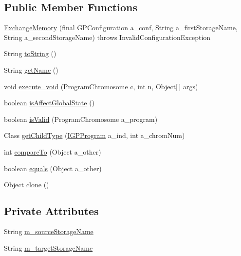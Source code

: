 \subsection*{Public Member Functions}
\begin{DoxyCompactItemize}
\item 
\hyperlink{classorg_1_1jgap_1_1gp_1_1function_1_1_exchange_memory_a19922874a417c3e1754dbcac64d1d609}{Exchange\-Memory} (final G\-P\-Configuration a\-\_\-conf, String a\-\_\-first\-Storage\-Name, String a\-\_\-second\-Storage\-Name)  throws Invalid\-Configuration\-Exception 
\item 
String \hyperlink{classorg_1_1jgap_1_1gp_1_1function_1_1_exchange_memory_abecb2cbef10e036fe2602ef2e7ebe6d9}{to\-String} ()
\item 
String \hyperlink{classorg_1_1jgap_1_1gp_1_1function_1_1_exchange_memory_a1888688c7830172d9efc8d5976a18182}{get\-Name} ()
\item 
void \hyperlink{classorg_1_1jgap_1_1gp_1_1function_1_1_exchange_memory_a7746ebbfa85047f4987e2f17ab14b7ec}{execute\-\_\-void} (Program\-Chromosome c, int n, Object\mbox{[}$\,$\mbox{]} args)
\item 
boolean \hyperlink{classorg_1_1jgap_1_1gp_1_1function_1_1_exchange_memory_a3e44871ecef23f1319115126c507492b}{is\-Affect\-Global\-State} ()
\item 
boolean \hyperlink{classorg_1_1jgap_1_1gp_1_1function_1_1_exchange_memory_a8a7b2f3f28f305950657c3fb1c597e14}{is\-Valid} (Program\-Chromosome a\-\_\-program)
\item 
Class \hyperlink{classorg_1_1jgap_1_1gp_1_1function_1_1_exchange_memory_ae0f4275863f8280cee3ea80a8ae443a9}{get\-Child\-Type} (\hyperlink{interfaceorg_1_1jgap_1_1gp_1_1_i_g_p_program}{I\-G\-P\-Program} a\-\_\-ind, int a\-\_\-chrom\-Num)
\item 
int \hyperlink{classorg_1_1jgap_1_1gp_1_1function_1_1_exchange_memory_a100919887fc656c32d6ed003bf0809ee}{compare\-To} (Object a\-\_\-other)
\item 
boolean \hyperlink{classorg_1_1jgap_1_1gp_1_1function_1_1_exchange_memory_adf5ac5c705e34613ffd01910a5e2d9c0}{equals} (Object a\-\_\-other)
\item 
Object \hyperlink{classorg_1_1jgap_1_1gp_1_1function_1_1_exchange_memory_ac44f399e3ebb48ab2928b5e4d1a00570}{clone} ()
\end{DoxyCompactItemize}
\subsection*{Private Attributes}
\begin{DoxyCompactItemize}
\item 
String \hyperlink{classorg_1_1jgap_1_1gp_1_1function_1_1_exchange_memory_ac94c29b7e908326420fe3ae8dc09690c}{m\-\_\-source\-Storage\-Name}
\item 
String \hyperlink{classorg_1_1jgap_1_1gp_1_1function_1_1_exchange_memory_aa65bd98ffa825ffc64636d27227c7d51}{m\-\_\-target\-Storage\-Name}
\end{DoxyCompactItemize}
